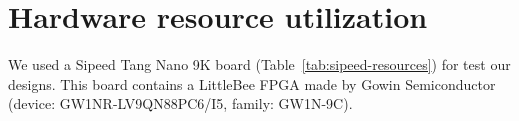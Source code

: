 

\section{Hardware resource utilization}


We used a Sipeed Tang Nano 9K board (Table~\ref{tab:sipeed-resources})
for test our designs.
This board contains a LittleBee \gls{FPGA} made by Gowin Semiconductor
(device: GW1NR-LV9QN88PC6/I5, family: GW1N-9C).

